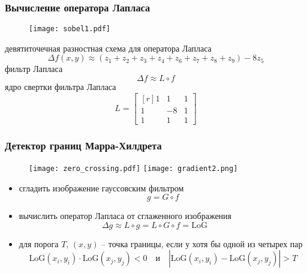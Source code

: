 \documentclass[
    12pt, 
    usepdftitle=false,
    aspectratio=1610
]{beamer}
\begin{document}
\begin{frame}
\frametitle{Вычисление оператора Лапласа}
\begin{figure}
    \centering
    \texttt{[image: sobel1.pdf]}
\end{figure}
    девятиточечная разностная схема для оператора Лапласа
    $$
        \Delta f(x,y)\approx 
        (z_1+z_2+z_3+z_4+z_6+z_7+z_8+z_9)-8z_5
    $$
    фильтр Лапласа
    $$
        \Delta f\approx L \circ f
    $$
    ядро свертки фильтра Лапласа
    $$
        L =
        \begin{bmatrix*}[r]
            1 & 1 & 1 \\
            1 & -8 & 1 \\
            1 & 1 & 1
        \end{bmatrix*}
    $$
\end{frame}

\begin{frame}
\frametitle{Детектор границ Марра-Хилдрета}
\begin{figure}
    \centering
    \texttt{[image: zero\_crossing.pdf]}
    \hspace{1cm}
    \texttt{[image: gradient2.png]}
\end{figure}
\begin{itemize}
    \item сгладить изображение гауссовским фильтром
    $$
        g = G \circ f
    $$

    \item вычислить оператор Лапласа от сглаженного изображения
    $$
        \Delta g\approx
        L\circ g=L\circ G \circ f=\mathrm{LoG}\qquad
    $$
    \item для порога $T$, $(x,y)$ -- точка границы, если у хотя бы одной из четырех пар
    $$
        \mathrm{LoG}(x_i,y_i)\cdot\mathrm{LoG}(x_j,y_j)<0
        \quad\mbox{и}\quad
        \left|\mathrm{LoG}(x_i,y_i)-\mathrm{LoG}(x_j,y_j)\right| > T
    $$
    
\end{itemize}
\end{frame}
\end{document}
